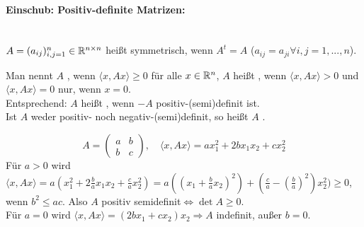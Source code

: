 \paragraph{Einschub: Positiv-definite Matrizen:}\mbox{}\\
$ A=(a_{ij})_{i,j=1}^n\in\mathbb{R}^{n\times n} $ hei\ss t symmetrisch, wenn $ A^t=A $ ($ a_{ij}=a_{ji}\forall i,j=1,...,n $).
\begin{definition}
	Man nennt $ A $ , wenn $ \langle x,Ax\rangle\geq 0 $ f\"ur alle $ x\in\mathbb{R}^n $, $ A $ hei\ss t , wenn $ \langle x,Ax\rangle>0 $ und $ \langle x,Ax\rangle=0 $ nur, wenn $ x=0 $.\\
	Entsprechend: $ A $ hei\ss t , wenn $ -A $ positiv-(semi)definit ist.\\
	Ist $ A $ weder positiv- noch negativ-(semi)definit, so hei\ss t $ A $ .
\end{definition}
\begin{beispiel*}
	\[ A=\begin{pmatrix}
	a&b\\b&c
	\end{pmatrix},\quad\langle x,Ax\rangle=ax^2_1+2bx_1x_2+cx^2_2 \]
	F\"ur $ a>0 $ wird $ \langle x,Ax\rangle=a(x_1^2+2\frac{b}{a}x_1x_2+\frac{c}{a}x_2^2)=a((x_1+\frac{b}{a}x_2)^2)+(\frac{c}{a}-(\frac{b}{a})^2)x_2^2)\geq 0 $, wenn $ b^2\leq ac $. Also $ A $ positiv semidefinit$ \Leftrightarrow\det A\geq 0 $.\\
	F\"ur $ a=0 $ wird $ \langle x,Ax\rangle=(2bx_1+cx_2)x_2\Rightarrow A$ indefinit, au\ss er $ b=0 $.
\end{beispiel*}
%
%
%
%
%
